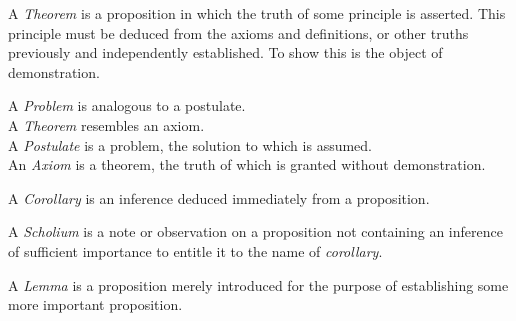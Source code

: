 \documentclass[12pt]{article}
\begin{document}
\vspace{0.4cm}

\noindent
A \emph{Theorem} is a proposition in which the truth of some principle is
asserted. This principle must be deduced from the axioms and definitions, or
other truths previously and independently established. To show this is the
object of demonstration.

\vspace{0.5cm}

\begin{center}
A \emph{Problem} is analogous to a postulate.\\[4pt]
A \emph{Theorem} resembles an axiom.\\[4pt]
A \emph{Postulate} is a problem, the solution to which is assumed.\\[4pt]
An \emph{Axiom} is a theorem, the truth of which is granted without demonstration.
\end{center}

\vspace{0.5cm}

\noindent
A \emph{Corollary} is an inference deduced immediately from a proposition.

\vspace{0.4cm}

\noindent
A \emph{Scholium} is a note or observation on a proposition not containing an
inference of sufficient importance to entitle it to the name of
\emph{corollary}.

\vspace{0.4cm}

\noindent
A \emph{Lemma} is a proposition merely introduced for the purpose of
establishing some more important proposition.
\end{document}
